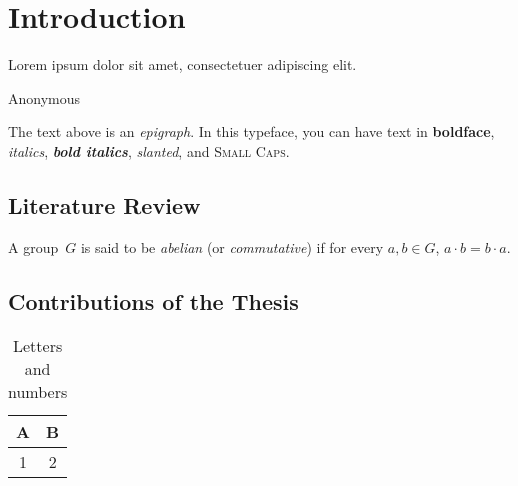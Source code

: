 
\chapter{Introduction}

\epigraph{Lorem ipsum dolor sit amet,
consectetuer adipiscing elit.}{Anonymous}

The text above is an \emph{epigraph}. In this typeface, you can have
text in \textbf{boldface}, \emph{italics}, \textbf{\emph{bold
    italics}}, \textsl{slanted}, and \textsc{Small Caps}.

\section{Literature Review}

\blindtext\pagenote{\blindtext}

\blindtext[2]

\begin{defn}
A group~$G$ is said to be \emph{abelian} (or \emph{commutative}) if
for every $a, b \in G$, $a \cdot b = b \cdot a$.
\end{defn}

\blindtext[2]

\section{Contributions of the Thesis}

\blindtext[3]

\begin{table}
  \begin{center}
  \begin{tabular}{c|c}
    A & B \\
    \hline
    1 & 2
  \end{tabular}
  \end{center}
  \caption{Letters and numbers}
\end{table}

\blindtext[3]
